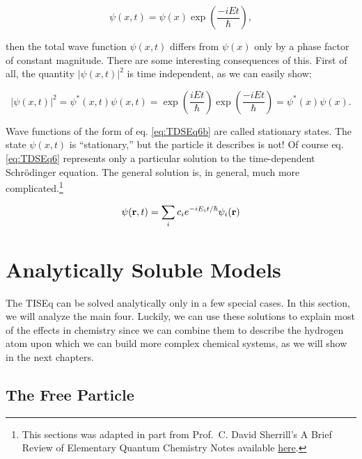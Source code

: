 \documentclass[
  9pt,
]{extbook}
\theoremstyle{definition}
\theoremstyle{definition}
\theoremstyle{definition}
\theoremstyle{remark}
\begin{document}
\begin{equation}
\psi(x, t) = \psi(x) \exp\left(\frac{-iEt}{\hbar}\right),
\label{eq:TDSEq6b}
\end{equation}

then the total wave function \(\psi(x, t)\) differs from \(\psi(x)\) only by a phase factor of constant magnitude. There are some interesting consequences of this. First of all, the quantity \(\vert \psi(x, t) \vert^2\) is time independent, as we can easily show:

\begin{equation}
\vert \psi(x, t) \vert^2 = \psi^{*}(x, t) \psi(x, t)=
\exp\left(\frac{iEt}{\hbar}\right)\exp\left(\frac{-iEt}{\hbar}\right)=
\psi^{*}(x) \psi(x).
\label{eq:TDSEq7}
\end{equation}

Wave functions of the form of eq. \eqref{eq:TDSEq6b} are called stationary states. The state \(\psi(x, t)\) is ``stationary,'' but the particle it describes is not!
Of course eq. \eqref{eq:TDSEq6} represents only a particular solution to the time-dependent Schrödinger equation. The general solution is, in general, much more complicated.\footnote{This sections was adapted in part from Prof.~C. David Sherrill's A Brief Review of Elementary Quantum Chemistry Notes available \href{http://vergil.chemistry.gatech.edu/notes/quantrev/node1.html}{here}.}

\begin{equation}
\psi({\bf r}, t) = \sum_i c_i e^{-iE_it / \hbar} \psi_i({\bf r})
\end{equation}

\hypertarget{Models}{%
\chapter{Analytically Soluble Models}\label{Models}}

The TISEq can be solved analytically only in a few special cases. In this section, we will analyze the main four. Luckily, we can use these solutions to explain most of the effects in chemistry since we can combine them to describe the hydrogen atom upon which we can build more complex chemical systems, as we will show in the next chapters.

\hypertarget{the-free-particle}{%
\section{The Free Particle}\label{the-free-particle}}
\end{document}

